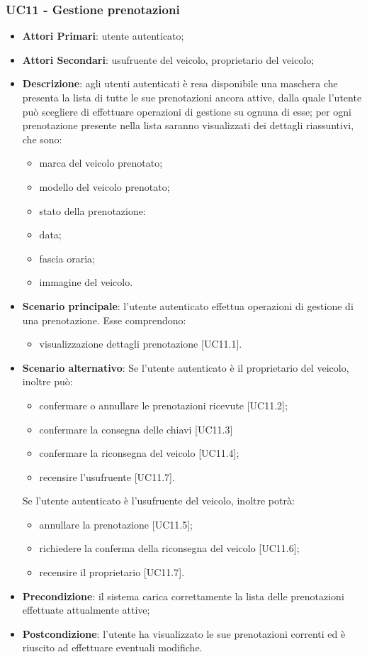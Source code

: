 \subsubsection{UC11 - Gestione prenotazioni}
\begin{itemize}
	\item \textbf{Attori Primari}: utente autenticato;
	\item \textbf{Attori Secondari}:
	usufruente del veicolo, proprietario del veicolo;
	\item \textbf{Descrizione}: agli utenti autenticati è resa disponibile una maschera che presenta la lista di tutte le sue prenotazioni ancora attive, dalla quale l'utente può scegliere di effettuare operazioni di gestione su ognuna di esse;
	per ogni prenotazione presente nella lista saranno visualizzati dei dettagli riassuntivi, che sono:
	\begin{itemize}
		\item marca del veicolo prenotato;
		\item modello del veicolo prenotato;
		\item stato della prenotazione:
		\item data;
		\item fascia oraria;
		\item immagine del veicolo.
	\end{itemize}
	\item \textbf{Scenario principale}: l'utente autenticato effettua operazioni di gestione di una prenotazione. Esse comprendono:
	\begin{itemize}
		\item visualizzazione dettagli prenotazione [UC11.1].
	\end{itemize}
	\item \textbf{Scenario alternativo}: Se l'utente autenticato è il proprietario del veicolo, inoltre può:
	\begin{itemize}
		\item confermare o annullare le prenotazioni ricevute [UC11.2];
		\item confermare la consegna delle chiavi [UC11.3]
		\item confermare la riconsegna del veicolo [UC11.4];
		\item recensire l'usufruente [UC11.7].
	\end{itemize}
	Se l'utente autenticato è l'usufruente del veicolo, inoltre potrà:
	\begin{itemize}
		\item annullare la prenotazione [UC11.5];
		\item richiedere la conferma della riconsegna del veicolo [UC11.6];
		\item recensire il proprietario [UC11.7].
	\end{itemize}
	\item \textbf{Precondizione}: il sistema carica correttamente la lista delle prenotazioni effettuate attualmente attive;
	\item \textbf{Postcondizione}: l'utente ha visualizzato le sue prenotazioni correnti ed è riuscito ad effettuare eventuali modifiche.
\end{itemize} 
